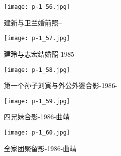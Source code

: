 \clearpage


\begin{figure}
    \begin{center}
        \texttt{[image: p-1\_56.jpg]}
        \begin{shaded}
            \caption{建新与卫兰婚前照--}
        \end{shaded}
    \end{center}
\end{figure}

\clearpage


\begin{figure}
    \begin{center}
        \texttt{[image: p-1\_57.jpg]}
        \begin{shaded}
            \caption{建玲与志宏结婚照-1985-}
        \end{shaded}
    \end{center}
\end{figure}

\clearpage


\begin{figure}
    \begin{center}
        \texttt{[image: p-1\_58.jpg]}
        \begin{shaded}
            \caption{第一个孙子刘寅与外公外婆合影-1986-}
        \end{shaded}
    \end{center}
\end{figure}

\clearpage


\begin{figure}
    \begin{center}
        \texttt{[image: p-1\_59.jpg]}
        \begin{shaded}
            \caption{四兄妹合影-1986-曲靖}
        \end{shaded}
    \end{center}
\end{figure}

\clearpage


\begin{figure}
    \begin{center}
        \texttt{[image: p-1\_60.jpg]}
        \begin{shaded}
            \caption{全家团聚留影-1986-曲靖}
        \end{shaded}
    \end{center}
\end{figure}

